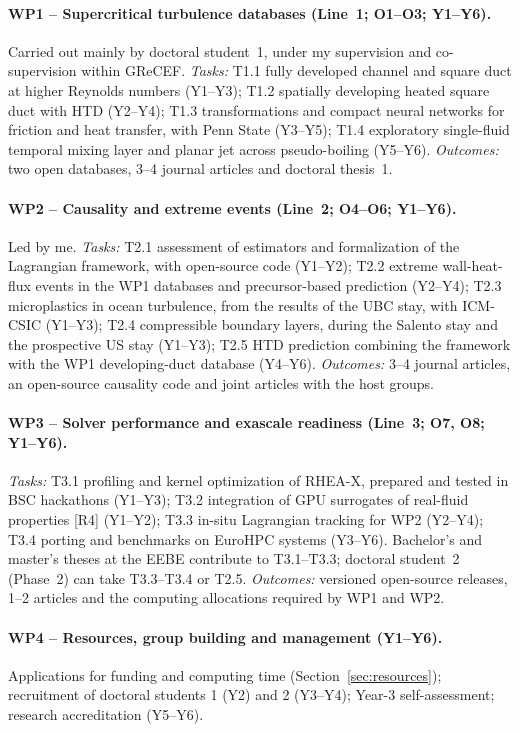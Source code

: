 \documentclass[11pt]{article}
\begin{document}
\paragraph{WP1 -- Supercritical turbulence databases (Line~1; O1--O3; Y1--Y6).} Carried out
mainly by doctoral student~1, under my supervision and co-supervision within GReCEF.
\emph{Tasks:} T1.1 fully developed channel and square duct at higher Reynolds numbers
(Y1--Y3); T1.2 spatially developing heated square duct with HTD (Y2--Y4); T1.3 transformations
and compact neural networks for friction and heat transfer, with Penn State (Y3--Y5); T1.4
exploratory single-fluid temporal mixing layer and planar jet across pseudo-boiling (Y5--Y6).
\emph{Outcomes:} two open databases, 3--4 journal articles and doctoral thesis~1.

\paragraph{WP2 -- Causality and extreme events (Line~2; O4--O6; Y1--Y6).} Led by me.
\emph{Tasks:} T2.1 assessment of estimators and formalization of the Lagrangian framework,
with open-source code (Y1--Y2); T2.2 extreme wall-heat-flux events in the WP1 databases and
precursor-based prediction (Y2--Y4); T2.3 microplastics in ocean turbulence, from the results
of the UBC stay, with ICM-CSIC (Y1--Y3); T2.4 compressible boundary layers, during the
Salento stay and the prospective US stay (Y1--Y3); T2.5 HTD prediction combining the
framework with the WP1 developing-duct database (Y4--Y6).
\emph{Outcomes:} 3--4 journal articles, an open-source causality code and joint articles with
the host groups.

\paragraph{WP3 -- Solver performance and exascale readiness (Line~3; O7, O8; Y1--Y6).}
\emph{Tasks:} T3.1 profiling and kernel optimization of RHEA-X, prepared and tested in BSC
hackathons (Y1--Y3); T3.2 integration of GPU surrogates of real-fluid properties [R4] (Y1--Y2);
T3.3 in-situ Lagrangian tracking for WP2 (Y2--Y4); T3.4 porting and benchmarks on EuroHPC
systems (Y3--Y6). Bachelor's and master's theses at the EEBE contribute to T3.1--T3.3;
doctoral student~2 (Phase~2) can take T3.3--T3.4 or T2.5.
\emph{Outcomes:} versioned open-source releases, 1--2 articles and the computing allocations
required by WP1 and WP2.

\paragraph{WP4 -- Resources, group building and management (Y1--Y6).} Applications for
funding and computing time (Section~\ref{sec:resources}); recruitment of doctoral students
1 (Y2) and 2 (Y3--Y4); Year-3 self-assessment; research accreditation (Y5--Y6).
\end{document}
